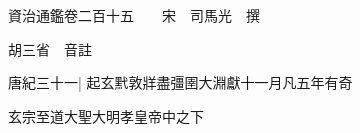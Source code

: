 






























































資治通鑑卷二百十五　　宋　司馬光　撰

胡三省　音註

唐紀三十一|{
	起玄黓敦牂盡彊圉大淵獻十一月凡五年有奇}


玄宗至道大聖大明孝皇帝中之下

